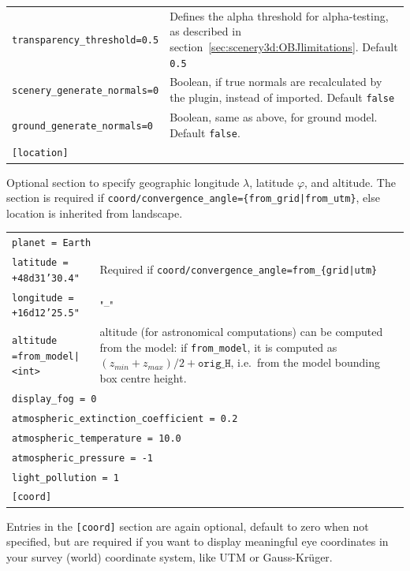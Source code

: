 \noindent%
\begin{tabularx}{\textwidth}{lX} 
\texttt{transparency\_threshold=0.5}  &Defines the alpha threshold for alpha-testing, as described in section~\ref{sec:scenery3d:OBJlimitations}. Default \texttt{0.5}\\
\texttt{scenery\_generate\_normals=0} &Boolean, if true normals are recalculated by the plugin, instead of imported. Default \texttt{false}\\
\texttt{ground\_generate\_normals=0}  &Boolean, same as above, for ground model. Default \texttt{false}.\\
\texttt{[location]}                   &
\end{tabularx}

\noindent Optional section to specify geographic longitude $\lambda$, latitude $\varphi$,
and altitude. The section is required if \verb:coord/convergence_angle={from_grid|from_utm}:, else
location is inherited from landscape.

\noindent%
\begin{tabularx}{\textwidth}{lX} 
\multicolumn{2}{l}{\texttt{planet = Earth}}\\
\texttt{latitude = +48d31'30.4"}      & Required if \texttt{coord/convergence\_angle=from\_\{grid|utm\}}\\
\texttt{longitude = +16d12'25.5"}     & "--"\\
\texttt{altitude =from\_model|<int>}   &  altitude (for astronomical computations) can be computed from the model:  if
                                           \texttt{from\_model}, it is computed as $(z_{min}+z_{max})/2+\mathtt{orig\_H}$, 
                                            i.e.\ from the model bounding box centre height.\\
\multicolumn{2}{l}{\texttt{display\_fog = 0}}\\
\multicolumn{2}{l}{\texttt{atmospheric\_extinction\_coefficient = 0.2}}\\
\multicolumn{2}{l}{\texttt{atmospheric\_temperature = 10.0}}\\
\multicolumn{2}{l}{\texttt{atmospheric\_pressure = -1}}\\
\multicolumn{2}{l}{\texttt{light\_pollution = 1}}\\
\multicolumn{2}{l}{\texttt{[coord]}}\\
\end{tabularx}

\noindent Entries in the \verb|[coord]| section are again optional,
default to zero when not specified, but are required if you want to
display meaningful eye coordinates in your survey (world) coordinate
system, like UTM or Gauss-Kr\"uger.

